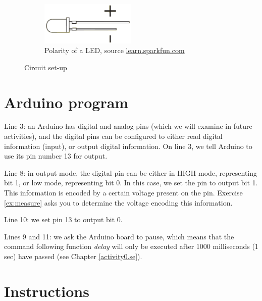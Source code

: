 \documentclass[12pt]{book}
\begin{document}
\begin{figure}[tb]
\begin{subfigure}{0.5\textwidth}
\includegraphics[width=0.5\textwidth]{schem/diode-part.png}
\caption{Polarity of a LED, source \url{learn.sparkfun.com}}
\label{fig:diode}
\end{subfigure}
\caption{Circuit set-up}
\label{fig:setupA1}
\end{figure}


\section{Arduino program}

\begin{compactitem}[--]
\item Line 3: an Arduino has digital and analog pins (which we will
  examine in future activities), and the digital pins can be
  configured to either read digital information (input), or output
  digital information. On line 3, we tell Arduino to use its pin
  number 13 for output. 
\item Line 8: in output mode, the digital pin can be either in HIGH
  mode, representing bit 1, or low mode, representing bit 0. In this
  case, we set the pin to output bit 1. This 
  information is encoded by a certain voltage present on the
  pin. Exercise \ref*{ex:measure} asks you to determine the voltage
  encoding this information. 
\item Line 10: we set pin 13 to output bit 0.
\item Lines 9 and 11: we ask the Arduino board to pause, which means
  that the command following function \emph{delay} will only be
  executed after 1000 milliseconds (1 sec) have passed (see Chapter
  \ref{activity0.se}). 
\end{compactitem}




\section {Instructions}
\end{document}
